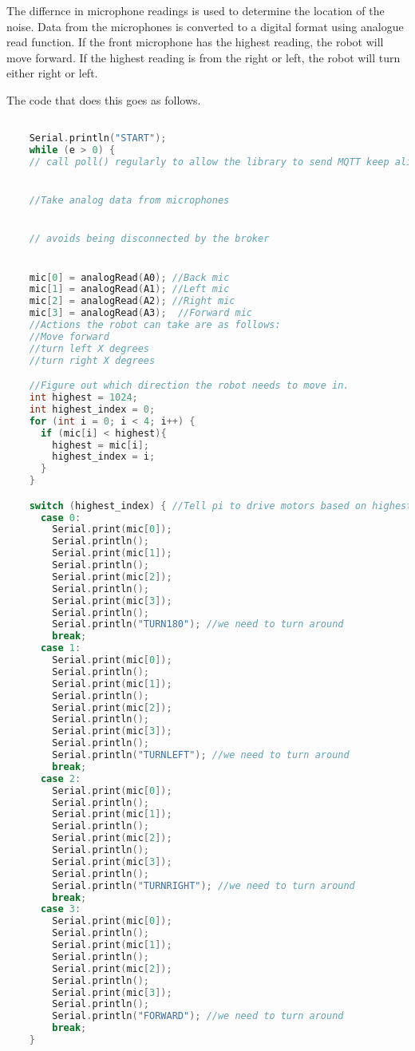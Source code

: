 \documentclass[12pt,a4paper]{article}
\begin{document}
\newpage

The differnce in microphone readings is used to determine the location of the noise.
Data from the microphones is converted to a digital format using analogue read function.
If the front microphone has the highest reading, the robot will move forward.
If the highest reading is from the right or left, the robot will turn either right or left.

The code that does this goes as follows.

\begin{lstlisting}[language=C, caption=Microphone Code]

    Serial.println("START");
    while (e > 0) {
    // call poll() regularly to allow the library to send MQTT keep alive which


    //Take analog data from microphones


    // avoids being disconnected by the broker


    mic[0] = analogRead(A0); //Back mic
    mic[1] = analogRead(A1); //Left mic
    mic[2] = analogRead(A2); //Right mic
    mic[3] = analogRead(A3);  //Forward mic
    //Actions the robot can take are as follows:
    //Move forward
    //turn left X degrees
    //turn right X degrees

    //Figure out which direction the robot needs to move in.
    int highest = 1024;
    int highest_index = 0;
    for (int i = 0; i < 4; i++) {
      if (mic[i] < highest){
        highest = mic[i];
        highest_index = i;
      }
    }

    switch (highest_index) { //Tell pi to drive motors based on highest reading.
      case 0:
        Serial.print(mic[0]);
        Serial.println();
        Serial.print(mic[1]);
        Serial.println();
        Serial.print(mic[2]);
        Serial.println();
        Serial.print(mic[3]);
        Serial.println();
        Serial.println("TURN180"); //we need to turn around
        break;
      case 1:
        Serial.print(mic[0]);
        Serial.println();
        Serial.print(mic[1]);
        Serial.println();
        Serial.print(mic[2]);
        Serial.println();
        Serial.print(mic[3]);
        Serial.println();
        Serial.println("TURNLEFT"); //we need to turn around
        break;
      case 2:
        Serial.print(mic[0]);
        Serial.println();
        Serial.print(mic[1]);
        Serial.println();
        Serial.print(mic[2]);
        Serial.println();
        Serial.print(mic[3]);
        Serial.println();
        Serial.println("TURNRIGHT"); //we need to turn around
        break;
      case 3:
        Serial.print(mic[0]);
        Serial.println();
        Serial.print(mic[1]);
        Serial.println();
        Serial.print(mic[2]);
        Serial.println();
        Serial.print(mic[3]);
        Serial.println();
        Serial.println("FORWARD"); //we need to turn around
        break;
    }


\end{lstlisting}
\end{document}
